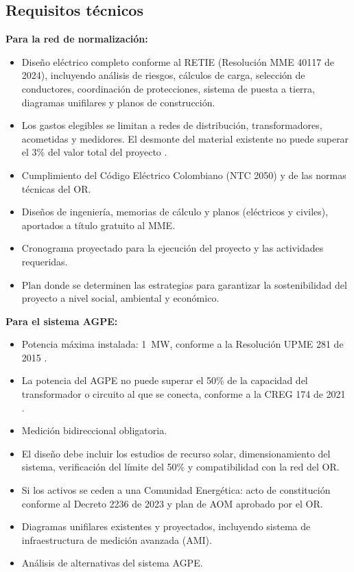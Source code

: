 \subsection{Requisitos técnicos}
\label{subsec:req_tecnicos}

\textbf{Para la red de normalización:}
\begin{itemize}
    \item Diseño eléctrico completo conforme al RETIE (Resolución MME
    40117 de 2024), incluyendo análisis de riesgos, cálculos de carga,
    selección de conductores, coordinación de protecciones, sistema de
    puesta a tierra, diagramas unifilares y planos de construcción.
    \item Los gastos elegibles se limitan a redes de distribución,
    transformadores, acometidas y medidores. El desmonte del material
    existente no puede superar el 3\% del valor total del proyecto
    \parencite{DUR1073_2015}.
    \item Cumplimiento del Código Eléctrico Colombiano (NTC 2050) y de
    las normas técnicas del OR.
    \item Diseños de ingeniería, memorias de cálculo y planos (eléctricos
    y civiles), aportados a título gratuito al MME.
    \item Cronograma proyectado para la ejecución del proyecto y las
    actividades requeridas.
    \item Plan donde se determinen las estrategias para garantizar la
    sostenibilidad del proyecto a nivel social, ambiental y económico.
\end{itemize}

\textbf{Para el sistema AGPE:}
\begin{itemize}
    \item Potencia máxima instalada: 1~MW, conforme a la Resolución
    UPME 281 de 2015 \parencite{ResolucionUPME281_2015}.
    \item La potencia del AGPE no puede superar el 50\% de la capacidad
    del transformador o circuito al que se conecta, conforme a la
    CREG 174 de 2021 \parencite{ResolucionCREG174_2021}.
    \item Medición bidireccional obligatoria.
    \item El diseño debe incluir los estudios de recurso solar,
    dimensionamiento del sistema, verificación del límite del 50\% y
    compatibilidad con la red del OR.
    \item Si los activos se ceden a una Comunidad Energética: acto de
    constitución conforme al Decreto 2236 de 2023 y plan de AOM
    aprobado por el OR.
    \item Diagramas unifilares existentes y proyectados, incluyendo
    sistema de infraestructura de medición avanzada (AMI).
    \item Análisis de alternativas del sistema AGPE.
\end{itemize}

